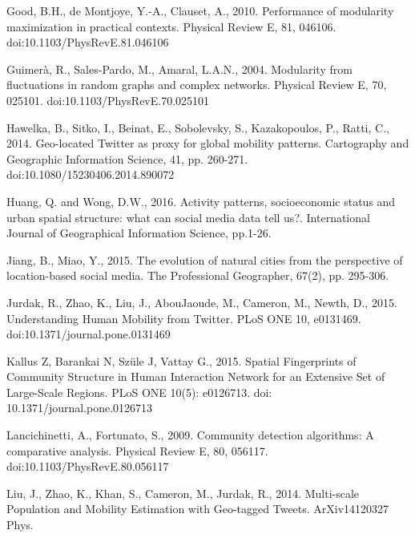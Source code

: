 \documentclass[]{tGIS2e}
\begin{document}
\begin{thebibliography}{9}
Good, B.H., de Montjoye, Y.-A., Clauset, A., 2010. Performance of modularity maximization in practical contexts. Physical Review E, 81, 046106. doi:10.1103/PhysRevE.81.046106

Guimerà, R., Sales-Pardo, M., Amaral, L.A.N., 2004. Modularity from fluctuations in random graphs and complex networks. Physical Review E, 70, 025101. doi:10.1103/PhysRevE.70.025101

Hawelka, B., Sitko, I., Beinat, E., Sobolevsky, S., Kazakopoulos, P., Ratti, C., 2014. Geo-located Twitter as proxy for global mobility patterns. Cartography and Geographic Information Science, 41, pp. 260-271. doi:10.1080/15230406.2014.890072

Huang, Q. and Wong, D.W., 2016. Activity patterns, socioeconomic status and urban spatial structure: what can social media data tell us?. International Journal of Geographical Information Science, pp.1-26.

Jiang, B., Miao, Y., 2015. The evolution of natural cities from the perspective of location-based social media. The Professional Geographer, 67(2), pp. 295-306.

Jurdak, R., Zhao, K., Liu, J., AbouJaoude, M., Cameron, M., Newth, D., 2015. Understanding Human Mobility from Twitter. PLoS ONE 10, e0131469. doi:10.1371/journal.pone.0131469

Kallus Z, Barankai N, Szüle J, Vattay G., 2015. Spatial Fingerprints of Community Structure in Human Interaction Network for an Extensive Set of Large-Scale Regions. PLoS ONE 10(5): e0126713. doi: 10.1371/journal.pone.0126713 

Lancichinetti, A., Fortunato, S., 2009. Community detection algorithms: A comparative analysis. Physical Review E, 80, 056117. doi:10.1103/PhysRevE.80.056117

Liu, J., Zhao, K., Khan, S., Cameron, M., Jurdak, R., 2014. Multi-scale Population and Mobility Estimation with Geo-tagged Tweets. ArXiv14120327 Phys.


\end{thebibliography}
\end{document}
